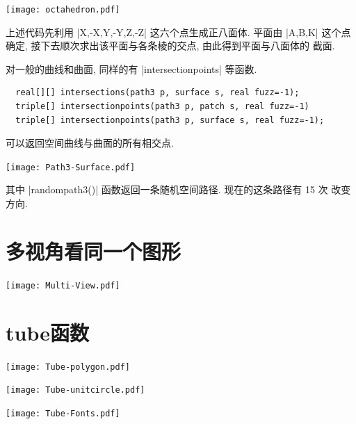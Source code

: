 \documentclass{ctexbook}
\begin{document}
\begin{center}\texttt{[image: octahedron.pdf]}\end{center}%

上述代码先利用 |X,-X,Y,-Y,Z,-Z| 这六个点生成正八面体. 平面由 |A,B,K|
这个点确定, 接下去顺次求出该平面与各条棱的交点, 由此得到平面与八面体的
截面.

对一般的曲线和曲面, 同样的有 |intersectionpoints| 等函数.
\begin{lstlisting}
  real[][] intersections(path3 p, surface s, real fuzz=-1);
  triple[] intersectionpoints(path3 p, patch s, real fuzz=-1)
  triple[] intersectionpoints(path3 p, surface s, real fuzz=-1);
\end{lstlisting}
可以返回空间曲线与曲面的所有相交点.
\begin{center}\texttt{[image: Path3-Surface.pdf]}\end{center}%

其中 |randompath3()| 函数返回一条随机空间路径. 现在的这条路径有 15 次
改变方向.

\section{多视角看同一个图形}
\begin{center}\texttt{[image: Multi-View.pdf]}\end{center}%


\section{tube函数}
\begin{center}\texttt{[image: Tube-polygon.pdf]}\end{center}%


\begin{center}\texttt{[image: Tube-unitcircle.pdf]}\end{center}%


\begin{center}\texttt{[image: Tube-Fonts.pdf]}\end{center}%

\end{document}
